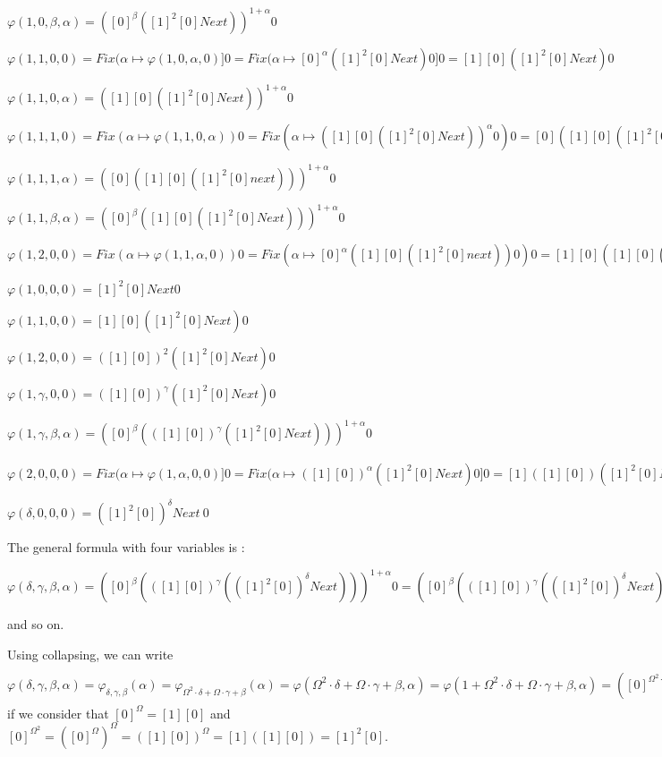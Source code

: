 \documentclass[10pt]{article}
\begin{document}
\( \varphi(1,0,\beta,\alpha) = ([0]^\beta ([1]^2 [0] Next))^{1+\alpha} 0 \)

\( \varphi(1,1,0,0) = Fix (\alpha \mapsto \varphi(1,0,\alpha,0)] 0 = Fix (\alpha \mapsto [0]^\alpha ([1]^2 [0] Next) 0] 0 = [1] [0] ([1]^2 [0] Next) 0 \)

\( \varphi(1,1,0,\alpha) = ([1] [0] ([1]^2 [0] Next))^{1+\alpha} 0 \)

\( \varphi(1,1,1,0) = Fix (\alpha \mapsto \varphi(1,1,0,\alpha)) 0 = Fix (\alpha \mapsto ([1] [0] ([1]^2 [0] Next))^\alpha 0) 0 = [0] ([1] [0] ([1]^2 [0] Next)) 0 \)

\( \varphi(1,1,1,\alpha) = ([0] ([1] [0] ([1]^2 [0] next)))^{1+\alpha} 0 \)

\( \varphi(1,1,\beta,\alpha) = ([0]^\beta ([1] [0] ([1]^2 [0] Next)))^{1+\alpha} 0 \)

\( \varphi(1,2,0,0) = Fix (\alpha \mapsto \varphi(1,1,\alpha,0)) 0 = Fix (\alpha \mapsto [0]^\alpha ([1] [0] ([1]^2 [0] next)) 0) 0 = [1] [0] ([1] [0] ([1]^2 [0] Next)) 0 = ([1] [0])^2 ([1]^2 [0] Next) 0 \)

\( \varphi(1,0,0,0) = [1]^2 [0] Next 0 \)

\( \varphi(1,1,0,0) = [1] [0] ([1]^2 [0] Next) 0 \)

\( \varphi(1,2,0,0) = ([1] [0])^2 ([1]^2 [0] Next) 0 \)

\( \varphi(1,\gamma,0,0) = ([1] [0])^\gamma ([1]^2 [0] Next) 0 \)

\( \varphi(1,\gamma,\beta,\alpha) = ([0]^\beta (([1] [0])^\gamma ([1]^2 [0] Next)))^{1+\alpha} 0 \)

\( \varphi(2,0,0,0) = Fix (\alpha \mapsto \varphi(1,\alpha,0,0)] 0 = Fix (\alpha \mapsto ([1] [0])^\alpha ([1]^2 [0] Next) 0] 0 = [1] ([1] [0]) ([1]^2 [0] Next) 0 = [1]^2 [0] ([1]^2 [0] Next) 0 = ([1]^2 [0])^2 Next 0 \)

\( \varphi(\delta,0,0,0) = ([1]^2 [0])^\delta Next\ 0 \)

The general formula with four variables is : 

\( \varphi(\delta,\gamma,\beta,\alpha) = ([0]^\beta (([1] [0])^\gamma (([1]^2 [0])^\delta Next)))^{1+\alpha} 0 = ([0]^\beta (([1] [0])^\gamma (([1]^2 [0])^\delta Next)))^{1+\alpha} \omega \) 

and so on.

\bigskip


Using collapsing, we can write \( \varphi(\delta,\gamma,\beta,\alpha) = \varphi_{\delta,\gamma,\beta}(\alpha) = \varphi_{\Omega^2 \cdot \delta + \Omega \cdot \gamma + \beta}(\alpha) = \varphi(\Omega^2 \cdot \delta + \Omega \cdot \gamma + \beta, \alpha) = \varphi(1 + \Omega^2 \cdot \delta + \Omega \cdot \gamma + \beta, \alpha) = ([0]^{\Omega^2 \cdot \delta + \Omega \cdot \gamma + \beta} Next)^{1+\alpha} 0 = ([0]^\beta (([0]^\Omega)^\gamma (([0]^{\Omega^2})^\delta Next)))^{1+\alpha} 0 = ([0]^\beta (([1] [0])^\gamma (([1]^2 [0])^\delta Next)))^{1+\alpha} 0 \) if we consider that \( [0]^\Omega = [1] [0] \) and \( [0]^{\Omega^2} = ([0]^\Omega)^\Omega = ([1] [0])^\Omega = [1] ([1] [0]) = [1]^2 [0] \).
\end{document}
